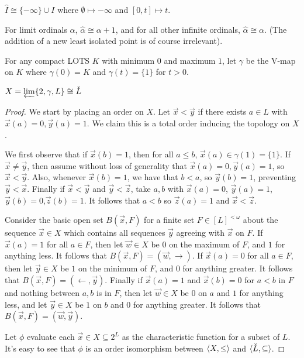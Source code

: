 \documentclass[11pt]{article}
\newcommand{\vect}{\vec}
\begin{document}
  \begin{example}
    \(\hat I\cong\{-\infty\}\cup I\) where
    \(\emptyset\mapsto-\infty\) and \([0,t]\mapsto t\).
  \end{example}

  \begin{example}
    For limit ordinals \(\alpha\), \(\hat \alpha\cong \alpha+1\),
    and for all other infinite ordinals, \(\hat\alpha\cong\alpha\).
    (The addition of a new least isolated point is of course irrelevant).
  \end{example}

  \begin{definition}
    For any compact LOTS \(K\) with minimum \(0\) and maximum \(1\),
    let \(\gamma\) be the V-map on \(K\) where \(\gamma(0)=K\) and \(\gamma(t)=\{1\}\)
    for \(t>0\).
  \end{definition}

  \begin{theorem}
    \(X=\varprojlim \{2, \gamma, L\}\cong \check L\)
  \end{theorem}

  \begin{proof}
    We start by placing an order on \(X\). Let \(\vect x<\vect y\) if
    there exists \(a\in L\) with \(\vect x(a)=0,\vect y(a)=1\). We claim this is
    a total order inducing the topology on \(X\).

    We first observe that if \(\vect x(b)=1\), then for all \(a\leq b\),
    \(\vect x(a)\in\gamma(1)=\{1\}\). If \(\vect x\not=\vect y\), then assume
    without loss of generality that \(\vect x(a)=0,\vect y(a)=1\), so
    \(\vect x<\vect y\). Also, whenever \(\vect x(b)=1\), we have that \(b<a\),
    so \(\vect y(b)=1\), preventing \(\vect y<\vect x\). Finally if
    \(\vect x<\vect y\) and \(\vect y<\vect z\), take \(a,b\) with
    \(\vect x(a)=0\), \(\vect y(a)=1\),\(\vect y(b)=0\),\(\vect z(b)=1\). It
    follows that \(a<b\) so \(\vect z(a)=1\) and \(\vect x<\vect z\).

    Consider the basic open set \(B(\vect x,F)\) for a finite set
    \(F\in [L]^{<\omega}\)
    about the sequence \(\vect x\in X\) which contains all sequences
    \(\vect y\) agreeing with \(\vect x\) on \(F\). If \(\vect x(a)=1\) for all
    \(a\in F\), then let \(\vect w\in X\) be \(0\) on the maximum of \(F\),
    and \(1\) for anything less. It follows that
    \(B(\vect x,F)=(\vect w,\rightarrow)\). If \(\vect x(a)=0\) for all
    \(a\in F\), then let \(\vect y\in X\) be \(1\) on the minimum of \(F\),
    and \(0\) for anything greater. It follows that
    \(B(\vect x,F)=(\leftarrow,\vect y)\). Finally if \(\vect x(a)=1\) and
    \(\vect x(b)=0\) for \(a<b\) in \(F\) and nothing between \(a,b\) is in
    \(F\), then let \(\vect w\in X\) be \(0\) on \(a\)
    and \(1\) for anything less, and let \(\vect y\in X\) be \(1\) on \(b\)
    and \(0\) for anything greater. It follows that
    \(B(\vect x,F)=(\vect w,\vect y)\).

    Let \(\phi\) evaluate each \(\vect x\in X\subseteq 2^L\) as the
    characteristic function for a subset of \(L\). It's easy to see that
    \(\phi\) is an order isomorphism between \(\langle X,\leq\rangle\) and
    \(\langle\check L,\subseteq\rangle\).
  \end{proof}
\end{document}

